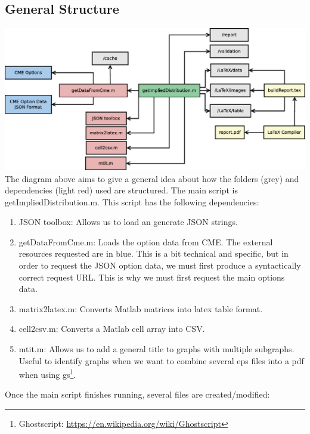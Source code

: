 \documentclass[10pt,a4paper]{book}
\begin{document}
\subsection{General Structure}
\includegraphics[width=\textwidth]{images/flow}
The diagram above aims to give a general idea about how the folders (grey) and dependencies (light red) used are structured. The main script is getImpliedDistribution.m. This script has the following dependencies:
\begin{enumerate}
  \item JSON toolbox: Allows us to load an generate JSON strings.
  \item getDataFromCme.m: Loads the option data from CME. The external resources requested are in blue. This is a bit technical and specific, but in order to request the JSON option data, we must first produce a syntactically correct request URL. This is why we must first request the main options data.
  \item matrix2latex.m: Converts Matlab matrices into latex table format.
  \item cell2csv.m: Converts a Matlab cell array into CSV.
  \item mtit.m: Allows us to add a general title to graphs with multiple subgraphs. Useful to identify graphs when we want to combine several eps files into a pdf when using gs\footnote{Ghostscript: \url{https://en.wikipedia.org/wiki/Ghostscript}}.
\end{enumerate}
Once the main script finishes running, several files are created/modified:
\end{document}
